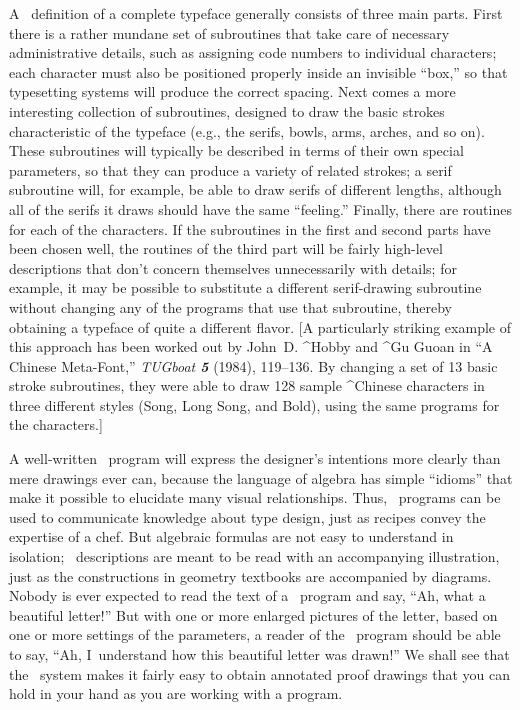 A \MF\ definition of a complete typeface generally consists of three
main parts. First there is a rather mundane set of subroutines that take care
of necessary administrative details, such as assigning code numbers
to individual characters; each character must also
be positioned properly inside an invisible ``box,'' so that typesetting
systems will produce the correct spacing. Next comes a more interesting
collection of subroutines, designed to draw the basic strokes characteristic
of the typeface (e.g., the serifs, bowls, arms, arches, and so on).
These subroutines will typically be described in terms of their own special
parameters, so that they can produce a variety of related strokes;
a serif subroutine will, for example, be able to draw serifs of
different lengths, although all of the serifs it draws should have the
same ``feeling.'' Finally, there are routines for each of the characters.
If the subroutines in the first and second parts have been chosen well,
the routines of the third part will be fairly high-level descriptions
that don't concern themselves unnecessarily with details; for example, it
may be possible to substitute a different serif-drawing subroutine without
changing any of the programs that use that subroutine, thereby obtaining
a typeface of quite a different flavor. [A particularly striking example
of this approach has been worked out by John~D. ^{Hobby} and ^{Gu} Guoan
in ``A Chinese Meta-Font,'' {\sl TUGboat\/ \bf5} (1984), 119--136. By
changing a set of 13 basic stroke subroutines, they were able to draw 128
sample ^{Chinese characters} in three different styles (Song, Long Song,
and Bold), using the same programs for the characters.]

A well-written \MF\ program will express the designer's intentions more
clearly than mere drawings ever can, because the language of algebra has
simple ``idioms'' that make it possible to elucidate many visual relationships.
Thus, \MF\ programs can be used to communicate knowledge
about type design, just as recipes convey the expertise of a chef. But
algebraic formulas are not easy to understand in isolation; \MF\ descriptions
are meant to be read with an accompanying illustration, just as the
constructions in geometry textbooks are accompanied by diagrams.
Nobody is ever expected to read the text of a \MF\ program and say,
``Ah, what a beautiful letter!'' But with one or more enlarged pictures
of the letter, based on one or more settings of the parameters, a reader
of the \MF\ program should be able to say, ``Ah, I~understand how this
beautiful letter was drawn!'' We shall see that the \MF\ system makes it
fairly easy to obtain annotated proof drawings that you can hold in your
hand as you are working with a program.

